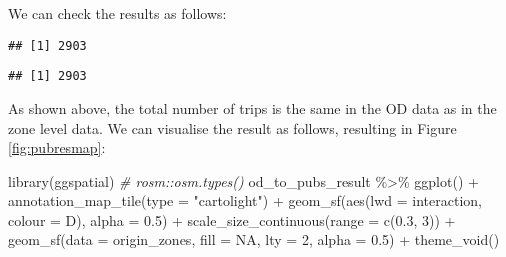 \documentclass[11pt,letterpaper]{article}
\newenvironment{Shaded}{\begin{snugshade}}{\end{snugshade}}
\newcommand{\AttributeTok}[1]{\textcolor[rgb]{0.77,0.63,0.00}{#1}}
\newcommand{\CommentTok}[1]{\textcolor[rgb]{0.56,0.35,0.01}{\textit{#1}}}
\newcommand{\ConstantTok}[1]{\textcolor[rgb]{0.00,0.00,0.00}{#1}}
\newcommand{\DecValTok}[1]{\textcolor[rgb]{0.00,0.00,0.81}{#1}}
\newcommand{\FloatTok}[1]{\textcolor[rgb]{0.00,0.00,0.81}{#1}}
\newcommand{\FunctionTok}[1]{\textcolor[rgb]{0.00,0.00,0.00}{#1}}
\newcommand{\NormalTok}[1]{#1}
\newcommand{\SpecialCharTok}[1]{\textcolor[rgb]{0.00,0.00,0.00}{#1}}
\newcommand{\StringTok}[1]{\textcolor[rgb]{0.31,0.60,0.02}{#1}}
\begin{document}
We can check the results as follows:

\begin{Shaded}
\end{Shaded}

\begin{verbatim}
## [1] 2903
\end{verbatim}

\begin{Shaded}
\end{Shaded}

\begin{verbatim}
## [1] 2903
\end{verbatim}

As shown above, the total number of trips is the same in the OD data as in the zone level data.
We can visualise the result as follows, resulting in Figure \ref{fig:pubresmap}:

\begin{Shaded}
\begin{Highlighting}[]
\FunctionTok{library}\NormalTok{(ggspatial)}
\CommentTok{\# rosm::osm.types()}
\NormalTok{od\_to\_pubs\_result }\SpecialCharTok{\%\textgreater{}\%} 
  \FunctionTok{ggplot}\NormalTok{() }\SpecialCharTok{+}
  \FunctionTok{annotation\_map\_tile}\NormalTok{(}\AttributeTok{type =} \StringTok{"cartolight"}\NormalTok{) }\SpecialCharTok{+}
  \FunctionTok{geom\_sf}\NormalTok{(}\FunctionTok{aes}\NormalTok{(}\AttributeTok{lwd =}\NormalTok{ interaction, }\AttributeTok{colour =}\NormalTok{ D), }\AttributeTok{alpha =} \FloatTok{0.5}\NormalTok{) }\SpecialCharTok{+}
  \FunctionTok{scale\_size\_continuous}\NormalTok{(}\AttributeTok{range =} \FunctionTok{c}\NormalTok{(}\FloatTok{0.3}\NormalTok{, }\DecValTok{3}\NormalTok{)) }\SpecialCharTok{+}
  \FunctionTok{geom\_sf}\NormalTok{(}\AttributeTok{data =}\NormalTok{ origin\_zones, }\AttributeTok{fill =} \ConstantTok{NA}\NormalTok{, }\AttributeTok{lty =} \DecValTok{2}\NormalTok{, }\AttributeTok{alpha =} \FloatTok{0.5}\NormalTok{) }\SpecialCharTok{+}
  \FunctionTok{theme\_void}\NormalTok{()}
\end{Highlighting}
\end{Shaded}
\end{document}
